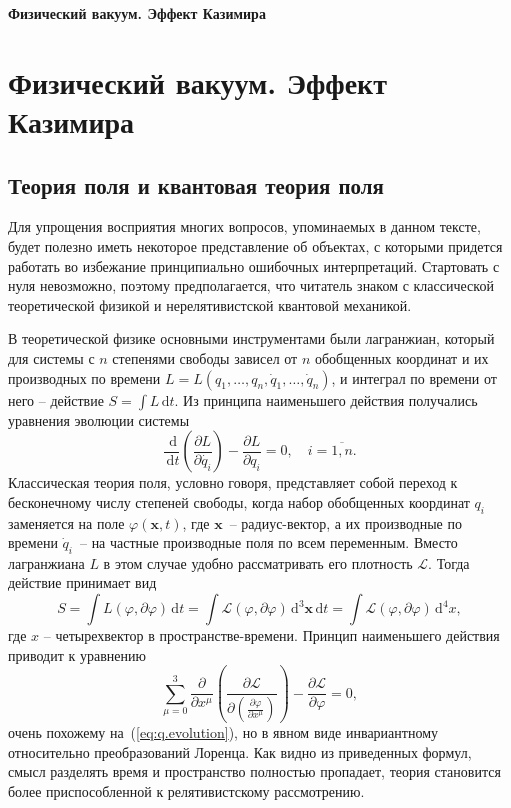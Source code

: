 \documentclass[a4paper, 12pt]{article}
\def\d{\,\mathrm{d}}
\def\vec#1{\mathbf{#1}}
\def\L{\mathcal{L}}
\def\phi{\varphi}
\begin{document}
\begin{center}
\bf\LARGE
Физический вакуум. Эффект Казимира
\end{center}
\tableofcontents

\setcounter{section}{6}
\section{Физический вакуум. Эффект Казимира}

\subsection{Теория поля и квантовая теория поля}
Для упрощения восприятия многих вопросов, упоминаемых в данном тексте, будет полезно иметь некоторое представление об объектах, с которыми придется работать во избежание принципиально ошибочных интерпретаций. 
Стартовать с нуля невозможно, поэтому предполагается, что читатель знаком с классической теоретической физикой и нерелятивистской квантовой механикой. 

В теоретической физике основными инструментами были лагранжиан, который для системы с $n$ степенями свободы зависел от $n$ обобщенных координат и их производных по времени $L = L(q_1, \ldots, q_n, \dot{q}_1, \ldots, \dot{q}_n)$, и интеграл по времени от него -- действие $S = \int L\d t$. 
Из принципа наименьшего действия получались уравнения эволюции системы
\begin{equation}
\frac{\d}{\d t} \left(\frac{\partial L}{\partial \dot{q_i}}\right) - \frac{\partial L}{\partial q_i} = 0 ,
\quad
i = \overline{1,n}
.
\label{eq:q.evolution}
\end{equation}
Классическая теория поля, условно говоря, представляет собой переход к бесконечному числу степеней свободы, когда набор обобщенных координат $q_i$ заменяется на поле $\phi(\vec{x}, t)$, где $\vec{x}$~-- радиус-вектор, а их производные по времени $\dot{q}_i$~-- на частные производные поля по всем переменным. 
Вместо лагранжиана $L$ в этом случае удобно рассматривать его плотность $\L$. 
Тогда действие принимает вид 
$$
S = \int L(\phi, \partial\phi) \d t = \int \L(\phi, \partial\phi) \d^3 \vec{x} \d t = \int \L(\phi, \partial\phi) \d^4x,
$$
где $x$ -- четырехвектор в пространстве-времени. 
Принцип наименьшего действия приводит к уравнению
\begin{equation}
\sum\limits_{\mu=0}^{3}\frac{\partial}{\partial x^\mu} \left(\frac{\partial \L}{\partial \left(\frac{\partial \phi}{\partial x^\mu}\right)}\right) - \frac{\partial \L}{\partial\phi} = 0 ,
\label{eq:phi.evolution}
\end{equation}
очень похожему на~(\ref{eq:q.evolution}), но в явном виде инвариантному относительно преобразований Лоренца.
Как видно из приведенных формул, смысл разделять время и пространство полностью пропадает, теория становится более приспособленной к релятивистскому рассмотрению. 
\end{document}
